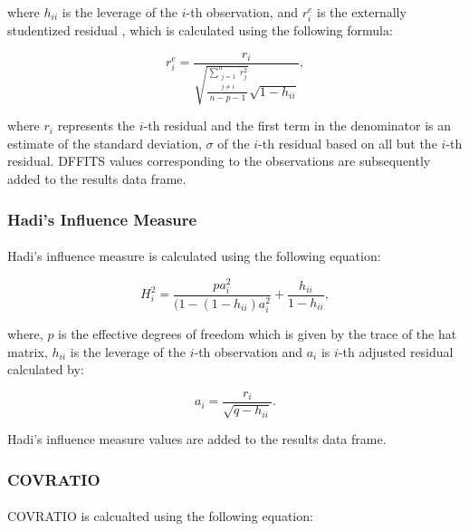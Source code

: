 \documentclass{article}
\begin{document}
where $h_{ii}$ is the leverage of the $i$-th observation, and $r^e_i$ is the externally studentized residual \parencite[]{residuals}, which is calculated using the following formula:

\begin{equation}
    r^e_i = \frac{r_i}{\sqrt{\frac{\sum_{\substack{j=1 \\ j\neq i}}^n {r_j^2}}{n-p-1}}\sqrt{1-h_{ii}}},
\end{equation}

where $r_i$ represents the $i$-th residual and the first term in the denominator is an estimate of the standard deviation, $\sigma$ of the $i$-th residual based on all but the $i$-th residual. DFFITS values corresponding to the observations are subsequently added to the results data frame.

\subsubsection{Hadi's Influence Measure}
\paragraph{}

Hadi's influence measure \parencite[]{hadi} is calculated using the following equation:

\begin{equation}
    H^2_i = \frac{pa_i^2}{(1-(1-h_{ii})a_i^2} + \frac{h_{ii}}{1-h_{ii}},
\end{equation}

where, $p$ is the effective degrees of freedom which is given by the trace of the hat matrix, $h_{ii}$ is the leverage of the $i$-th observation and $a_i$ is $i$-th adjusted residual calculated by:

\begin{equation}
    a_i = \frac{r_i}{\sqrt{q-h_{ii}}}.
\end{equation}

Hadi's influence measure values are added to the results data frame.

\subsubsection{COVRATIO}
\paragraph{}

COVRATIO \parencite[]{covratio} is calcualted using the following equation:
\end{document}
